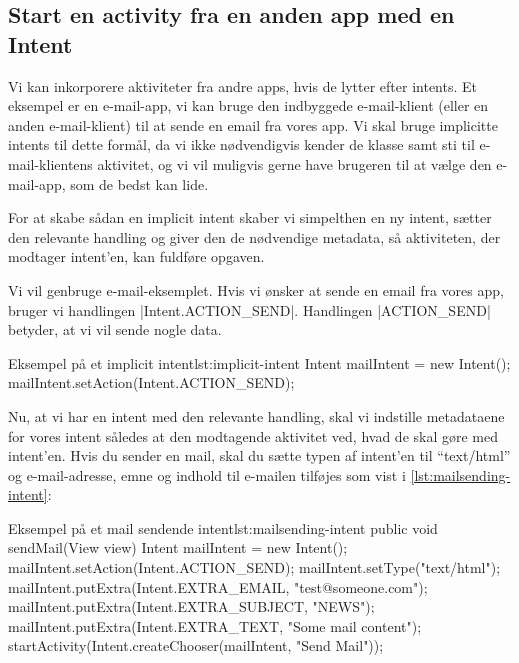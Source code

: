 \subsection{Start en activity fra en anden app med en Intent}

Vi kan inkorporere aktiviteter fra andre apps, hvis de lytter efter intents. Et eksempel er en e-mail-app, vi kan bruge den indbyggede e-mail-klient (eller en anden e-mail-klient) til at sende en email fra vores app. Vi skal bruge implicitte intents til dette formål, da vi ikke nødvendigvis kender de klasse samt sti til e-mail-klientens aktivitet, og vi vil muligvis gerne have brugeren til at vælge den e-mail-app, som de bedst kan lide.

For at skabe sådan en implicit intent skaber vi simpelthen en ny intent, sætter den relevante handling og giver den de nødvendige metadata, så aktiviteten, der modtager intent'en, kan fuldføre opgaven.

Vi vil genbruge e-mail-eksemplet. Hvis vi ønsker at sende en email fra vores app, bruger vi handlingen \JavaInline|Intent.ACTION_SEND|. Handlingen \JavaInline|ACTION_SEND| betyder, at vi vil sende nogle data.

\begin{example}\noindent
	\begin{JavaCode}{Eksempel på et implicit intent}{lst:implicit-intent}
		Intent mailIntent = new Intent();
		mailIntent.setAction(Intent.ACTION_SEND);
	\end{JavaCode}
\end{example}

Nu, at vi har en intent med den relevante handling, skal vi indstille metadataene for vores intent således at den modtagende aktivitet ved, hvad de skal gøre med intent'en. Hvis du sender en mail, skal du sætte typen af intent'en til ``text/html'' og e-mail-adresse, emne og indhold til e-mailen tilføjes som vist i \autoref{lst:mailsending-intent}:

\begin{example}\noindent
	\begin{JavaCode}{Eksempel på et mail sendende intent}{lst:mailsending-intent}
		public void sendMail(View view) {
			Intent mailIntent = new Intent();
			mailIntent.setAction(Intent.ACTION_SEND);
			mailIntent.setType("text/html");
			mailIntent.putExtra(Intent.EXTRA_EMAIL, "test@someone.com");
			mailIntent.putExtra(Intent.EXTRA_SUBJECT, "NEWS");
			mailIntent.putExtra(Intent.EXTRA_TEXT, "Some mail content");
			startActivity(Intent.createChooser(mailIntent, "Send Mail"));
		}
	\end{JavaCode}
\end{example}

